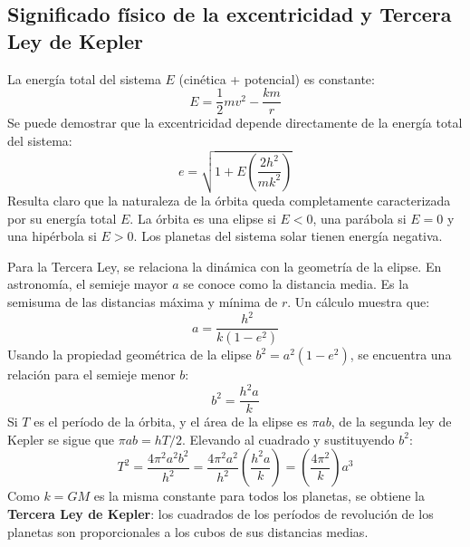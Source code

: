 \subsection{Significado físico de la excentricidad y Tercera Ley de Kepler}
La energía total del sistema $E$ (cinética + potencial) es constante:
\[ E = \frac{1}{2}mv^2 - \frac{km}{r} \]
Se puede demostrar que la excentricidad depende directamente de la energía total del sistema:
\[ e = \sqrt{1 + E\left(\frac{2h^2}{mk^2}\right)} \]
Resulta claro que la naturaleza de la órbita queda completamente caracterizada por su energía total $E$. La órbita es una elipse si $E<0$, una parábola si $E=0$ y una hipérbola si $E>0$. Los planetas del sistema solar tienen energía negativa.

Para la Tercera Ley, se relaciona la dinámica con la geometría de la elipse. En astronomía, el semieje mayor $a$ se conoce como la distancia media. Es la semisuma de las distancias máxima y mínima de $r$. Un cálculo muestra que:
\[ a = \frac{h^2}{k(1-e^2)} \]
Usando la propiedad geométrica de la elipse $b^2 = a^2(1-e^2)$, se encuentra una relación para el semieje menor $b$:
\[ b^2 = \frac{h^2 a}{k} \]
Si $T$ es el período de la órbita, y el área de la elipse es $\pi ab$, de la segunda ley de Kepler se sigue que $\pi ab = hT/2$. Elevando al cuadrado y sustituyendo $b^2$:
\[ T^2 = \frac{4\pi^2 a^2 b^2}{h^2} = \frac{4\pi^2 a^2}{h^2}\left(\frac{h^2a}{k}\right) = \left(\frac{4\pi^2}{k}\right)a^3 \]
Como $k=GM$ es la misma constante para todos los planetas, se obtiene la \textbf{Tercera Ley de Kepler}: los cuadrados de los períodos de revolución de los planetas son proporcionales a los cubos de sus distancias medias.

